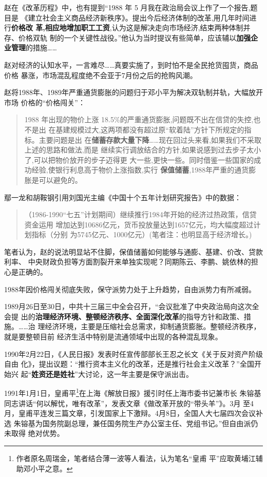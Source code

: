 赵在《改革历程》中，也有提到“1988 年 5 月我在政治局会议上作了一个报告,题目是
《建立社会主义商品经济新秩序》。提出今后经济体制的改革,用几年时间进行\textbf{价格改
  革,相应地增加职工工资},认为这是解决走向市场经济,结束两种体制并存、价格双轨
制的一个关键性战役。”他认为当时提议有些简单，应该辅以\textbf{加强企业管理}的措施……

赵对经济的认知水平，一言难尽……真要实施了，到时怕不是全民抢货囤货，商品价格
暴涨，市场混乱程度绝不会亚于7月份之后的抢购风潮。

赵将1988年、1989年严重通货膨胀的问题归于邓小平为解决双轨制并轨，大幅放开市场
价格的“价格闯关”：
\begin{quotation}
  1988 年出现的物价上涨 18.5\%的严重通货膨胀,问题既不出在信贷的失控,也不是出
  在基建规模过大,这两项都没有超过原“软着陆”方针下所规定的指标。主要问题是出
  在\textbf{储蓄存款大量下降}……现在回过头来看,如果我们不采取上述的思路和做法,而是
  继续实行调放结合的方针,如果说感到过去步子太小了,可以把物价放开的步子迈得更
  大一些,更快一些。同时借鉴一些国家的成功经验,使银行利息高于物价上涨指数,实行
  \textbf{保值储蓄},1988年严重的通货膨胀是可以避免的。\cite[129]{gaigelicheng}
\end{quotation}

鄢一龙和胡鞍钢引用刘国光主编《中国十个五年计划研究报告》中的数据：
\begin{quotation}
  （1986-1990“七五”计划期间）继续推行1984年开始的经济过热政策，信贷资金运用
  增加达到10686亿元，货币投放量达到1657亿元，均大幅度超过计划指标（分别
  为5745亿元、1000亿元）(笔者注：也明显高于经济增长。)\cite{shiyiwu}
\end{quotation}

笔者认为，赵的说法明显站不住脚，保值储蓄如何能够与通膨、基建、价改、贷款利率、
中央财政负担等方面割裂开来单独实现呢？同期陈云、李鹏、姚依林的担心是正确的。

1988年因价格闯关彻底失败，保守派势力处于上升趋势，自由派势力有所减弱。

1989月26日至30日，中共十三届三中全会召开，“会议批准了中央政治局向这次全会提
出的\textbf{治理经济环境、整顿经济秩序、全面深化改革}的指导方针和政策、措施。……治
理经济环境，主要是压缩社会总需求，抑制通货膨胀。整顿经济秩序，就是要整顿目前
经济生活中特别是流通领域中出现的各种混乱现象。

1990年2月22日，《人民日报》发表时任宣传部部长王忍之长文《关于反对资产阶级自由
化》，提出议题：“推行资本主义化的改革，还是推行社会主义改革？”全国开始兴
起“\textbf{姓资还是姓社}”大讨论，这一年主要是保守派出击。

1991年1月1日，皇甫平\footnote{作者原名周瑞金，笔者结合薄一波等人看法，认为笔名“皇甫
  平”应取黄埔江辅助邓小平之意。}在上海《解放日报》援引时任上海市委书记兼市长
朱镕基同志讲话“何以解忧，唯有改革”，发表文章《做改革开放的“带头羊”》。3月
至4月，皇甫平连发三篇文章，引发国家上下激辩。4月8日，全国人大七届四次会议补选
朱镕基为国务院副总理，兼任国务院生产办公室主任、党组书记。”但自由派仍未取得
绝对优势。

